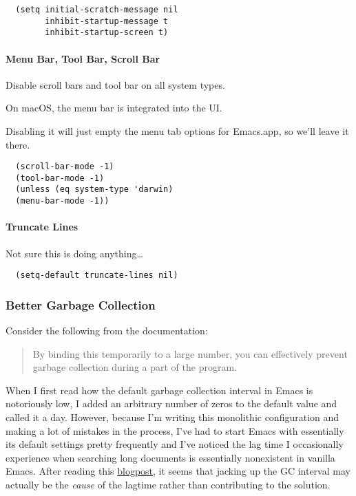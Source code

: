\documentclass[11pt]{article}
\begin{document}
\begin{verbatim}
  (setq initial-scratch-message nil
        inhibit-startup-message t
        inhibit-startup-screen t)
\end{verbatim}

\paragraph*{Menu Bar, Tool Bar, Scroll Bar}
\label{sec:org36504d7}

Disable scroll bars and tool bar on all system types.

On macOS, the menu bar is integrated into the UI.

Disabling it will just empty the menu tab options for Emacs.app,
so we'll leave it there.

\begin{verbatim}
  (scroll-bar-mode -1)
  (tool-bar-mode -1)
  (unless (eq system-type 'darwin)
  (menu-bar-mode -1))
\end{verbatim}

\paragraph*{Truncate Lines}
\label{sec:org2aa98d2}

Not sure this is doing anything\ldots{}

\begin{verbatim}
  (setq-default truncate-lines nil)
\end{verbatim}

\subsubsection*{Better Garbage Collection}
\label{sec:orgcb2db76}

Consider the following from the documentation:

\begin{quote}
By binding this temporarily to a large number, you can effectively
prevent garbage collection during a part of the program.
\end{quote}

When I first read how the default garbage collection interval in Emacs
is notoriously low, I added an arbitrary number of zeros to the
default value and called it a day. However, because I'm writing this monolithic
configuration and making a lot of mistakes in the process, I've had to
start Emacs with essentially its default settings pretty frequently
and I've noticed the lag time I occasionally experience when searching
long documents is essentially nonexistent in vanilla Emacs. After
reading this \href{http://bling.github.io/blog/2016/01/18/why-are-you-changing-gc-cons-threshold/}{blogpost}, it seems that jacking up the GC interval may
actually be the \emph{cause} of the lagtime rather than contributing to the
solution.
\end{document}
